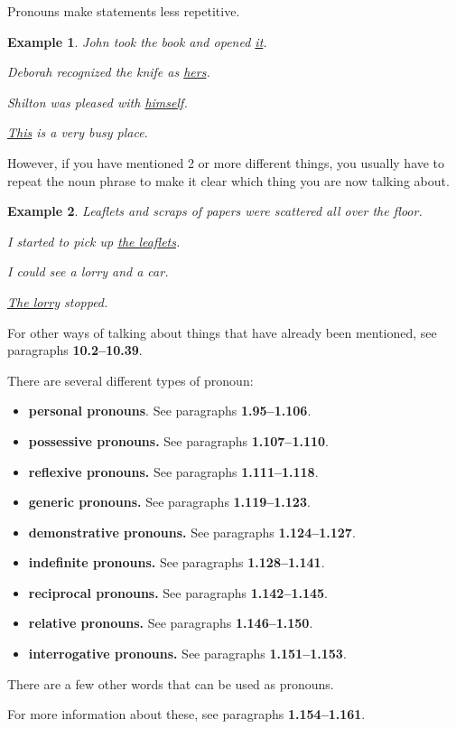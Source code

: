 \documentclass[oneside]{book}
\numberwithin{equation}{section}
\newtheorem{example}{Example}[section]
\begin{document}
%
Pronouns make statements less repetitive.
\begin{example}
    John took the book and opened \underline{it}.
    
    Deborah recognized the knife as \underline{hers}.
    
    Shilton was pleased with \underline{himself}.
    
    \underline{This} is a very busy place.
\end{example}
However, if you have mentioned 2 or more different things, you usually have to repeat the noun phrase to make it clear which thing you are now talking about.
\begin{example}
    Leaflets and scraps of papers were scattered all over the floor.
    
    I started to pick up \underline{the leaflets}.
    
    I could see a lorry and a car.
    
    \underline{The lorry} stopped.
\end{example}
For other ways of talking about things that have already been mentioned, see paragraphs \textbf{10.2--10.39}.

%
\noindent{} There are several different types of pronoun:
\begin{itemize}
    \item \textbf{personal pronouns}. See paragraphs \textbf{1.95--1.106}.
    \item \textbf{possessive pronouns.} See paragraphs \textbf{1.107--1.110}.
    \item \textbf{reflexive pronouns.} See paragraphs \textbf{1.111--1.118}.
    \item \textbf{generic pronouns.} See paragraphs \textbf{1.119--1.123}.
    \item \textbf{demonstrative pronouns.} See paragraphs \textbf{1.124--1.127}.
    \item \textbf{indefinite pronouns.} See paragraphs \textbf{1.128--1.141}.
    \item \textbf{reciprocal pronouns.} See paragraphs \textbf{1.142--1.145}.
    \item \textbf{relative pronouns.} See paragraphs \textbf{1.146--1.150}.
    \item \textbf{interrogative pronouns.} See paragraphs \textbf{1.151--1.153}.
\end{itemize}
There are a few other words that can be used as pronouns.

For more information about these, see paragraphs \textbf{1.154--1.161}.
\end{document}
